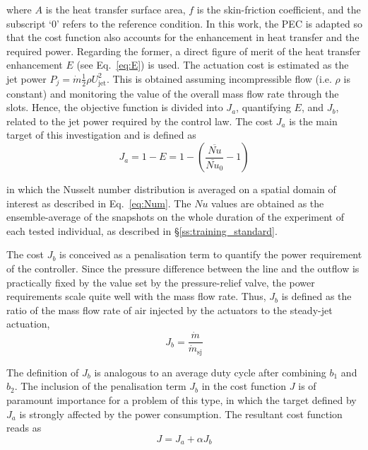 where $A$ is the heat transfer surface area, $f$ is the skin-friction coefficient, and the subscript `$0$' refers to the reference condition. In this work, the PEC is adapted so that the cost function also accounts for the enhancement in heat transfer and the required power. Regarding the former, a direct figure of merit of the heat transfer enhancement $E$ (see Eq.~\eqref{eq:E}) is used. The actuation cost is estimated as the jet power $P_{j} = \dot{m}\frac{1}{2}\rho U_\mathrm{jet}^2$. This is obtained assuming incompressible flow (i.e. $\rho$ is constant) and monitoring the value of the overall mass flow rate through the slots. Hence, the objective function is divided into $J_a$, quantifying $E$, and $J_b$, related to the jet power required by the control law. The cost $J_a$ is the main target of this investigation and is defined as
%
\begin{equation}\label{eq:Ja}
    J_a = 1 - E = 1 - \left( \frac{\overline{Nu}}{\overline{Nu}_\mathrm{0}} - 1 \right)
\end{equation}

in which the Nusselt number distribution is averaged on a spatial domain of interest as described in Eq.~\eqref{eq:Num}. The $Nu$ values are obtained as the ensemble-average of the snapshots on the whole duration of the experiment of each tested individual, as described in \S\ref{ss:training_standard}.

The cost $J_b$ is conceived as a penalisation term to quantify the power requirement of the controller. Since the pressure difference between the line and the outflow is practically fixed by the value set by the pressure-relief valve, the power requirements scale quite well with the mass flow rate. Thus, $J_b$ is defined as the ratio of the mass flow rate of air injected by the actuators to the steady-jet actuation,
%
\begin{equation}\label{eq:Jb}
    J_b = \frac{\dot{m}}{\dot{m}_\mathrm{sj}}
\end{equation}

The definition of $J_b$ is analogous to an average duty cycle after combining $b_1$ and $b_2$. The inclusion of the penalisation term $J_b$ in the cost function $J$ is of paramount importance for a problem of this type, in which the target defined by $J_a$ is strongly affected by the power consumption. The resultant cost function reads as
%
\begin{equation}\label{eq:J}
    J = J_a + \alpha J_b
\end{equation}

